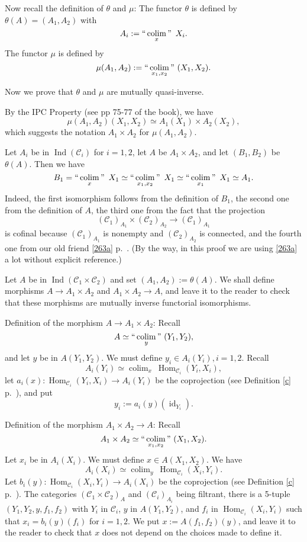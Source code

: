 \documentclass[12pt]{article}
\theoremstyle{remark}
\theoremstyle{definition}
\newcommand{\C}{\mathcal C}
\DeclareMathOperator*{\coli}{colim}
\DeclareMathOperator*{\co}{colim}
\DeclareMathOperator*{\ic}{``\coli"}
\DeclareMathOperator{\id}{id}
\DeclareMathOperator{\h}{Hom}
\DeclareMathOperator{\Ind}{Ind}
\begin{document}
Now recall the definition of $\theta$ and $\mu$: The functor $\theta$ is defined by $\theta(A)=(A_1,A_2)$ with 
$$
A_i:=\ic_x\ X_i. 
$$ 
The functor $\mu$ is defined by 
$$
\mu(A_1,A_2):=\ic_{x_1,x_2}\ (X_1,X_2). 
$$ 

Now we prove that $\theta$ and $\mu$ are mutually quasi-inverse. 

By the IPC Property (see pp 75-77 of the book), we have 
$$
\mu(A_1,A_2)(X_1,X_2)\simeq A_1(X_1)\times A_2(X_2), 
$$ 
which suggests the notation $A_1\times A_2$ for $\mu(A_1,A_2)$. 

Let $A_i$ be in $\Ind(\C_i)$ for $i=1,2$, let $A$ be $A_1\times A_2$, and let $(B_1,B_2)$ be $\theta(A)$. Then we have 
$$ 
B_1=\ic_x\ X_1\simeq\ic_{x_1,x_2}\ X_1\simeq\ic_{x_1}\ X_1\simeq A_1.
$$ 
Indeed, the first isomorphism follows from the definition of $B_1$, the second one from the definition of $A$, the third one from the fact that the projection 
$$
(\C_1)_{A_1}\times(\C_2)_{A_2}\to(\C_1)_{A_1}
$$ 
is cofinal because $(\C_1)_{A_1}$ is nonempty and $(\C_2)_{A_2}$ is connected, and the fourth one from our old friend \eqref{263a} p.~\pageref{263a}. (By the way, in this proof we are using \eqref{263a} a lot without explicit reference.) 

Let $A$ be in $\Ind(\C_1\times\C_2)$ and set $(A_1,A_2):=\theta(A)$. We shall define morphisms $A\to A_1\times A_2$ and $A_1\times A_2\to A$, and leave it to the reader to check that these morphisms are mutually inverse functorial isomorphisms. 

Definition of the morphism $A\to A_1\times A_2$: Recall 
$$
A\simeq\ic_y\ (Y_1,Y_2), 
$$ 
and let $y$ be in $A(Y_1,Y_2)$. We must define $y_i\in A_i(Y_i),i=1,2$. Recall 
$$
A_i(Y_i)\simeq\co_x\ \h_{\C_i}(Y_i,X_i), 
$$ 
let $a_i(x):\h_{\C_i}(Y_i,X_i)\to A_i(Y_i)$ be the coprojection (see Definition \ref{c} p.~\pageref{c}), and put 
$$
y_i:=a_i(y)(\id_{Y_i}). 
$$ 

Definition of the morphism $A_1\times A_2\to A$: Recall 
$$
A_1\times A_2\simeq\ic_{x_1,x_2}\ (X_1,X_2). 
$$ 
Let $x_i$ be in $A_i(X_i)$. We must define $x\in A(X_1,X_2)$. We have 
$$
A_i(X_i)\simeq\co_y\ \h_{\C_i}(X_i,Y_i). 
$$ 
Let $b_i(y):\h_{\C_i}(X_i,Y_i)\to A_i(X_i)$ be the coprojection (see Definition \ref{c} p.~\pageref{c}). The categories $(\C_1\times\C_2)_A$ and $(\C_i)_{A_i}$ being filtrant, there is a 5-tuple $(Y_1,Y_2,y,f_1,f_2)$ with $Y_i$ in $\C_i$, $y$ in $A(Y_1,Y_2)$, and $f_i$ in $\h_{\C_i}(X_i,Y_i)$ such that $x_i=b_i(y)(f_i)$ for $i=1,2$. We put $x:=A(f_1,f_2)(y)$, and leave it to the reader to check that $x$ does not depend on the choices made to define it. 
%
\end{document}
